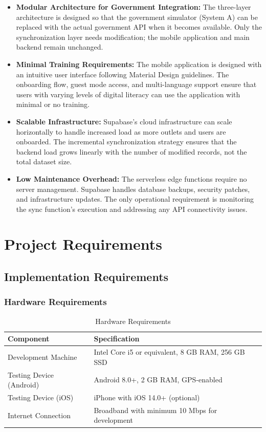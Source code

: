 \begin{itemize}
    \item \textbf{Modular Architecture for Government Integration:} The three-layer architecture is designed so that the government simulator (System A) can be replaced with the actual government API when it becomes available. Only the synchronization layer needs modification; the mobile application and main backend remain unchanged.

    \item \textbf{Minimal Training Requirements:} The mobile application is designed with an intuitive user interface following Material Design guidelines. The onboarding flow, guest mode access, and multi-language support ensure that users with varying levels of digital literacy can use the application with minimal or no training.

    \item \textbf{Scalable Infrastructure:} Supabase's cloud infrastructure can scale horizontally to handle increased load as more outlets and users are onboarded. The incremental synchronization strategy ensures that the backend load grows linearly with the number of modified records, not the total dataset size.

    \item \textbf{Low Maintenance Overhead:} The serverless edge functions require no server management. Supabase handles database backups, security patches, and infrastructure updates. The only operational requirement is monitoring the sync function's execution and addressing any API connectivity issues.
\end{itemize}

\section{Project Requirements}

\subsection{Implementation Requirements}

\subsubsection{Hardware Requirements}

\begin{table}[H]
\centering
\caption{Hardware Requirements}
\begin{tabularx}{\textwidth}{|l|X|}
\hline
\textbf{Component} & \textbf{Specification} \\
\hline
Development Machine & Intel Core i5 or equivalent, 8 GB RAM, 256 GB SSD \\
\hline
Testing Device (Android) & Android 8.0+, 2 GB RAM, GPS-enabled \\
\hline
Testing Device (iOS) & iPhone with iOS 14.0+ (optional) \\
\hline
Internet Connection & Broadband with minimum 10 Mbps for development \\
\hline
\end{tabularx}
\end{table}

